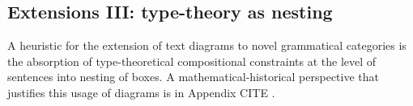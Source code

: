 \subsection{Extensions III: type-theory as nesting}

A heuristic for the extension of text diagrams to novel grammatical categories is the absorption of type-theoretical compositional constraints at the level of sentences into nesting of boxes. A mathematical-historical perspective that justifies this usage of diagrams is in Appendix \bR CITE \e.


\begin{example}

\end{example}


\begin{example}

\end{example}

